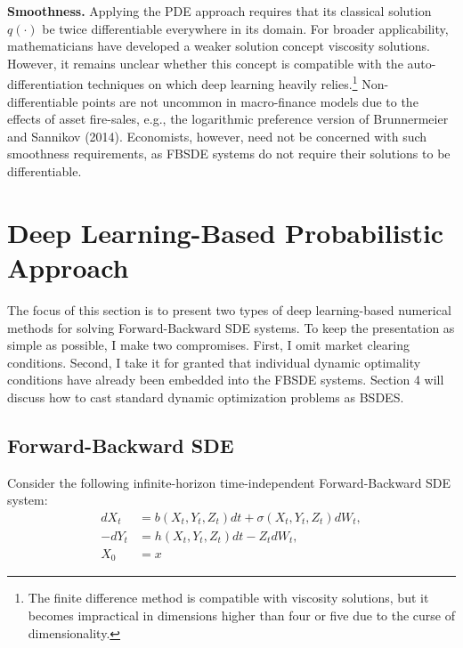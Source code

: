 \documentclass{article}
\begin{document}
\textbf{Smoothness.} Applying the PDE approach requires that its classical solution $q(\cdot)$ be twice differentiable everywhere in its domain. For broader applicability, mathematicians have developed a weaker solution concept viscosity solutions. However, it remains unclear whether this concept is compatible with the auto-differentiation techniques on which deep learning heavily relies.\footnote{The finite difference method is compatible with viscosity solutions, but it becomes impractical in dimensions higher than four or five due to the curse of dimensionality.} Non-differentiable points are not uncommon in macro-finance models due to the effects of asset fire-sales, e.g., the logarithmic preference version of Brunnermeier and Sannikov (2014). Economists, however, need not be concerned with such smoothness requirements, as FBSDE systems do not require their solutions to be differentiable.

\section{Deep Learning-Based Probabilistic Approach}

The focus of this section is to present two types of deep learning-based numerical methods for solving Forward-Backward SDE systems. To keep the presentation as simple as possible, I make two compromises. First, I omit market clearing conditions. Second, I take it for granted that individual dynamic optimality conditions have already been embedded into the FBSDE systems. Section 4 will discuss how to cast standard dynamic optimization problems as BSDES.

\subsection{Forward-Backward SDE}

Consider the following infinite-horizon time-independent Forward-Backward SDE system:
\begin{align*}
dX_{t}&=b(X_{t},Y_{t},Z_{t})dt+\sigma(X_{t},Y_{t},Z_{t})dW_{t}, \\
-dY_{t}&=h(X_{t},Y_{t},Z_{t})dt-Z_{t}dW_{t}, \\
X_{0}&=x
\end{align*}

\clearpage
\end{document}
